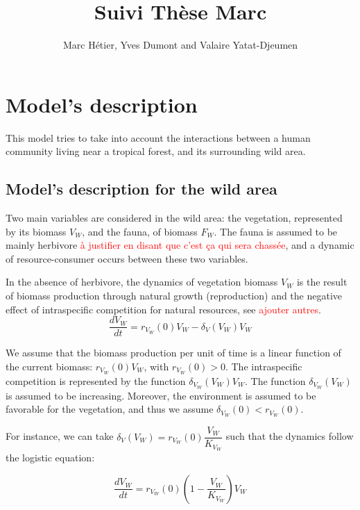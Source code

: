 \documentclass{article}
\title{Suivi Thèse Marc}
\author{Marc Hétier, Yves Dumont  and Valaire Yatat-Djeumen}
\newcommand{\marc}[1]{\textcolor{red}{#1}}
\begin{document}
\maketitle
{\hypersetup{hidelinks}
\tableofcontents}
\newpage

\section{Model's description}

This model tries to take into account the interactions between a human community living near a tropical forest, and its surrounding wild area.

\subsection{Model's description for the wild area}

Two main variables are considered in the wild area: the vegetation, represented by its biomass $V_W$, and the fauna, of biomass $F_W$. The fauna is assumed to be mainly herbivore \marc{à justifier en disant que c'est ça qui sera chassée}, and a dynamic of resource-consumer occurs between these two variables. 
\medskip

In the absence of herbivore, the dynamics of vegetation biomass $V_W$ is the result of biomass production through natural growth (reproduction) and the negative effect of intraspecific competition for natural resources, see \cite{lebon_direct_2014} \marc{ajouter autres}.
\begin{equation*}
\dfrac{dV_W}{dt} = r_{V_W}(0)V_W - \delta_V(V_W) V_W
\end{equation*}

We assume that the biomass production per unit of time is a linear function of the current biomass: $r_{V_W}(0)V_W$, with $
r_{V_W}(0) > 0$. The intraspecific competition is represented by the function $\delta_{V_W}(V_W) V_W$. The function $\delta_{V_W}(V_W)$ is assumed to be increasing. Moreover, the environment is assumed to be favorable for the vegetation, and thus we assume $\delta_{V_W}(0) < r_{V_W}(0)$.

For instance, we can take $\delta_V(V_W) = r_{V_W}(0) \dfrac{V_W}{K_{V_W}}$ such that the dynamics follow the logistic equation:

\begin{equation*}
\dfrac{dV_W}{dt} = r_{V_W}(0) \left(1 - \dfrac{V_W}{K_{V_W}} \right) V_W
\end{equation*}
\end{document}
